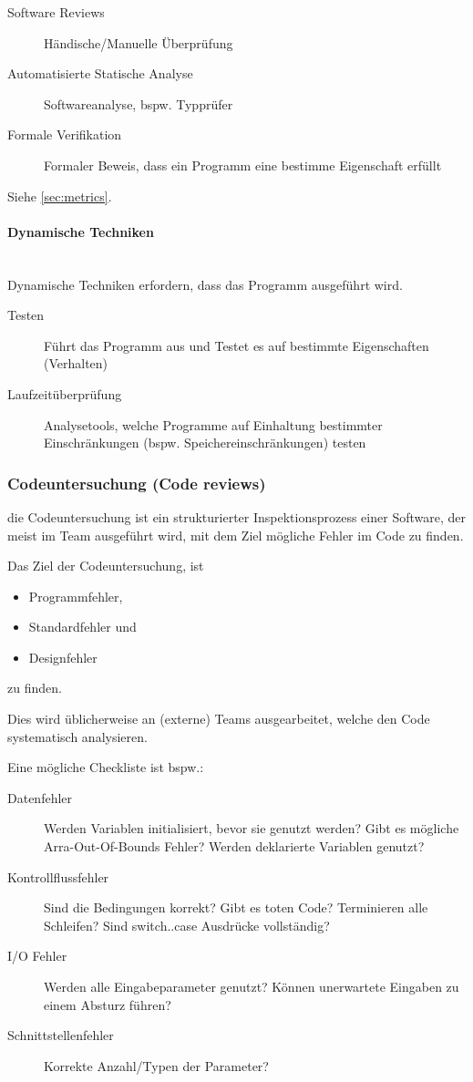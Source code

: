 \documentclass[ngerman,color=3b]{tuda_summary}
\begin{document}
\begin{description}
    \item[Software Reviews] Händische/Manuelle Überprüfung
    \item[Automatisierte Statische Analyse] Softwareanalyse, bspw. Typprüfer
    \item[Formale Verifikation] Formaler Beweis, dass ein Programm eine bestimme Eigenschaft erfüllt
\end{description}

Siehe \ref{sec:metrics}.

\paragraph{Dynamische Techniken}\mbox{}\\
Dynamische Techniken erfordern, dass das Programm ausgeführt wird.

\begin{description}
    \item[Testen] Führt das Programm aus und Testet es auf bestimmte Eigenschaften (Verhalten)
    \item[Laufzeitüberprüfung] Analysetools, welche Programme auf Einhaltung bestimmter Einschränkungen (bspw. Speichereinschränkungen) testen
\end{description}

\clearpage
\subsubsection{Codeuntersuchung (Code reviews)}
\begin{definition}
    die Codeuntersuchung ist ein strukturierter Inspektionsprozess einer Software,
    der meist im Team ausgeführt wird, mit dem Ziel mögliche Fehler im Code zu finden.
\end{definition}
Das Ziel der Codeuntersuchung, ist
\begin{itemize}
    \item Programmfehler,
    \item Standardfehler und
    \item Designfehler
\end{itemize}
zu finden.

Dies wird üblicherweise an (externe) Teams ausgearbeitet, welche den Code systematisch analysieren.

Eine mögliche Checkliste ist bspw.:
\begin{description}
    \item[Datenfehler] Werden Variablen initialisiert, bevor sie genutzt werden? Gibt es mögliche Arra-Out-Of-Bounds Fehler? Werden deklarierte Variablen genutzt?
    \item[Kontrollflussfehler] Sind die Bedingungen korrekt? Gibt es toten Code? Terminieren alle Schleifen? Sind switch..case Ausdrücke vollständig?
    \item[I/O Fehler] Werden alle Eingabeparameter genutzt? Können unerwartete Eingaben zu einem Absturz führen?
    \item[Schnittstellenfehler] Korrekte Anzahl/Typen der Parameter?
\end{description}
\end{document}
